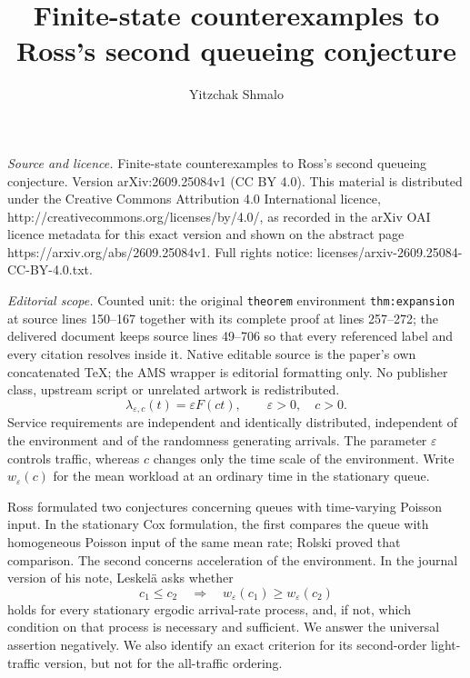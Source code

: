 \documentclass[10pt,a4paper]{amsart}
\numberwithin{equation}{section}
\newcommand{\1}{\mathbf 1}
\newcommand{\eps}{\varepsilon}
\begin{document}
\title[Finite-state counterexamples to Ross's second queueing conje]{Finite-state counterexamples to Ross's second queueing conjecture}
\author{Yitzchak Shmalo}
\date{}
\maketitle
\noindent\emph{Source and licence.} Finite-state counterexamples to Ross's second queueing conjecture. Version arXiv:2609.25084v1 (CC BY 4.0). This material is distributed under the Creative Commons Attribution 4.0 International licence, http://creativecommons.org/licenses/by/4.0/, as recorded in the arXiv OAI licence metadata for this exact version and shown on the abstract page https://arxiv.org/abs/2609.25084v1. Full rights notice: licenses/arxiv-2609.25084-CC-BY-4.0.txt.\par\smallskip
\noindent\textit{Editorial scope.} Counted unit: the original \texttt{theorem} environment \texttt{thm:expansion} at source lines 150--167 together with its complete proof at lines 257--272; the delivered document keeps source lines 49--706 so that every referenced label and every citation resolves inside it. Native editable source is the paper's own concatenated TeX; the AMS wrapper is editorial formatting only. No publisher class, upstream script or unrelated artwork is redistributed.
\begin{equation}\label{eq:arrival}
 \lambda_{\eps,c}(t)=\eps F(ct),\qquad \eps>0,\quad c>0.
\end{equation}
Service requirements are independent and identically distributed, independent of the environment and of the randomness generating arrivals. The parameter $\eps$ controls traffic, whereas $c$ changes only the time scale of the environment. Write $w_\eps(c)$ for the mean workload at an ordinary time in the stationary queue.

Ross \cite{Ross78} formulated two conjectures concerning queues with time-varying Poisson input. In the stationary Cox formulation, the first compares the queue with homogeneous Poisson input of the same mean rate; Rolski \cite{Rolski81} proved that comparison. The second concerns acceleration of the environment. In the journal version of his note, Leskel\"a \cite[Problem~1, p.~214]{Leskela22} asks whether
\begin{equation}\label{eq:ross}
 c_1\le c_2\quad\Longrightarrow\quad w_\eps(c_1)\ge w_\eps(c_2)
\end{equation}
holds for every stationary ergodic arrival-rate process, and, if not, which condition on that process is necessary and sufficient. We answer the universal assertion negatively. We also identify an exact criterion for its second-order light-traffic version, but not for the all-traffic ordering.
\end{document}
